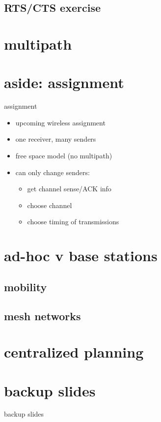 \subsection{RTS/CTS exercise}


\section{multipath}



\section{aside: assignment}
\begin{frame}{assignment}
    \begin{itemize}
    \item upcoming wireless assignment
    \item one receiver, many senders
    \item free space model (no multipath)
    \item can only change senders:
        \begin{itemize}
        \item get channel sense/ACK info
        \item choose channel
        \item choose timing of transmissions
        \end{itemize}
    \end{itemize}
\end{frame}

\section{ad-hoc v base stations}


\subsection{mobility}


\subsection{mesh networks}


\section{centralized planning}




\section{backup slides}
\begin{frame}{backup slides}
\end{frame}


